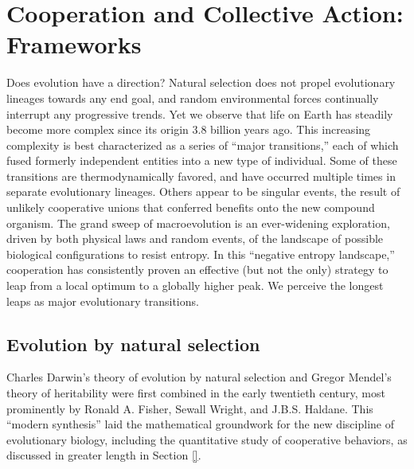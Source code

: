 \documentclass{tufte-book} %
\begin{document}
\chapter{Cooperation and Collective Action: Frameworks}\label{ch:framework}

\begin{tcolorbox}[colback=gray!5!white,colframe=teal!75!black,title=Summary]%

    \parbox{\textwidth}{%
     Does evolution have a direction? Natural selection does not propel evolutionary lineages towards any end goal, and random environmental forces continually interrupt any progressive trends. Yet we observe that life on Earth has steadily become more complex since its origin 3.8 billion years ago. This increasing complexity is best characterized as a series of “major transitions,” each of which fused formerly independent entities into a new type of individual. Some of these transitions are thermodynamically favored, and have occurred multiple times in separate evolutionary lineages. Others appear to be singular events, the result of unlikely cooperative unions that conferred benefits onto the new compound organism. The grand sweep of macroevolution is an ever-widening exploration, driven by both physical laws and random events, of the landscape of possible biological configurations to resist entropy. In this “negative entropy landscape,” cooperation has consistently proven an effective (but not the only) strategy to leap from a local optimum to a globally higher peak. We perceive the longest leaps as major evolutionary transitions.
    }%
\end{tcolorbox}


\section{Evolution by natural selection}\label{evol-natsel}


Charles Darwin’s theory of evolution by natural selection  and Gregor Mendel’s theory of heritability were first combined in the early twentieth century, most prominently by Ronald A. Fisher, Sewall Wright, and J.B.S. Haldane.\cite{darwin2009annotated, mendel1866versuche, fisher1958genetical, wright1931evolution, haldane1927mathematical} This “modern synthesis” laid the mathematical groundwork for the new discipline of evolutionary biology, including the quantitative study of cooperative behaviors, as discussed in greater length in Section \ref{}. 
    
\end{document}
